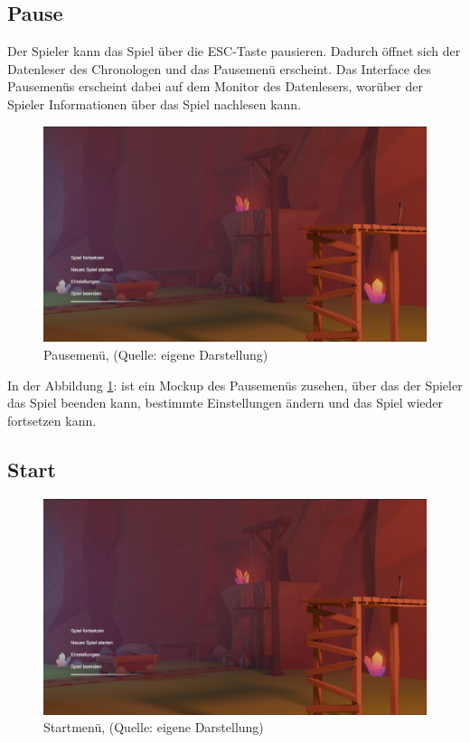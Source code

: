 \subsection{Pause}

Der Spieler kann das Spiel über die \ac{ESC}-Taste pausieren. Dadurch öffnet sich der Datenleser des Chronologen und das Pausemenü erscheint. Das Interface des Pausemenüs erscheint dabei auf dem Monitor des Datenlesers, worüber der Spieler Informationen über das Spiel nachlesen kann.

\begin{figure}[ht]
\centering
\includegraphics[width=1\linewidth]{content/pictures/StartScreen.jpg}
\caption{Pausemenü, (Quelle: eigene Darstellung)}
\label{fig:pausemenu}
\end{figure}

In der Abbildung \ref{fig:pausemenu}:  ist ein Mockup des Pausemenüs zusehen, über das der Spieler das Spiel beenden kann, bestimmte Einstellungen ändern und das Spiel wieder fortsetzen kann.

\subsection{Start}

\begin{figure}[ht]
\centering
\includegraphics[width=1\linewidth]{content/pictures/StartScreen.jpg}
\caption{Startmenü, (Quelle: eigene Darstellung)}
\label{fig:mainmenu}
\end{figure}

